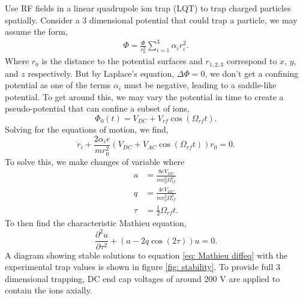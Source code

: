 Use RF fields in a linear quadrupole ion trap (LQT) to trap charged particles spatially.\cite{Wolfgang1990} Consider a 3 dimensional potential that could trap a particle, we may assume the form,
\begin{align*}
	\Phi = \frac{\Phi}{r_0^2} \sum_{i=1}^3 \alpha_i r_i^2.
\end{align*}
Where $r_0$ is the distance to the potential surfaces and $r_{1,2,3}$ correspond to $x$, $y$, and $z$ respectively. But by Laplace's equation, $\Delta \Phi = 0$, we don't get a confining potential as one of the terms $\alpha_i$ must be negative, leading to a saddle-like potential. To get around this, we may vary the potential in time to create a pseudo-potential that can confine a subset of ions,
\begin{equation*}
	\Phi_0(t) = V_{DC} + V_{rf} \cos(\Omega_{rf} t).
\end{equation*}
Solving for the equations of motion, we find,
\begin{equation}
	\ddot{r}_i + \frac{2 \alpha_i e}{m r_0^2}(V_{DC} + V_{AC} \cos(\Omega_{rf} t))r_0 = 0.
\end{equation}
To solve this, we make changes of variable where
\begin{align}
	a & = \frac{8eV_{DC}}{mr_0^2\Omega_{rf}^2} \label{eq: a param} \\
	q & = \frac{4eV_{DC}}{mr_0^2\Omega_{rf}^2} \label{eq: q param} \\
	\tau & = \frac{1}{2}\Omega_{rf} t. \nonumber
\end{align}
To then find the characteristic Mathieu equation,
\begin{equation}
	\frac{\partial^2 u}{\partial \tau^2} + (a - 2q \cos(2 \tau))u = 0.
	\label{eq: Mathieu diffeq}
\end{equation}
A diagram showing stable solutions to equation \ref{eq: Mathieu diffeq} with the experimental trap values is shown in figure \ref{fig: stability}. To provide full 3 dimensional trapping, DC end cap voltages of around 200 V are applied to contain the ions axially.

